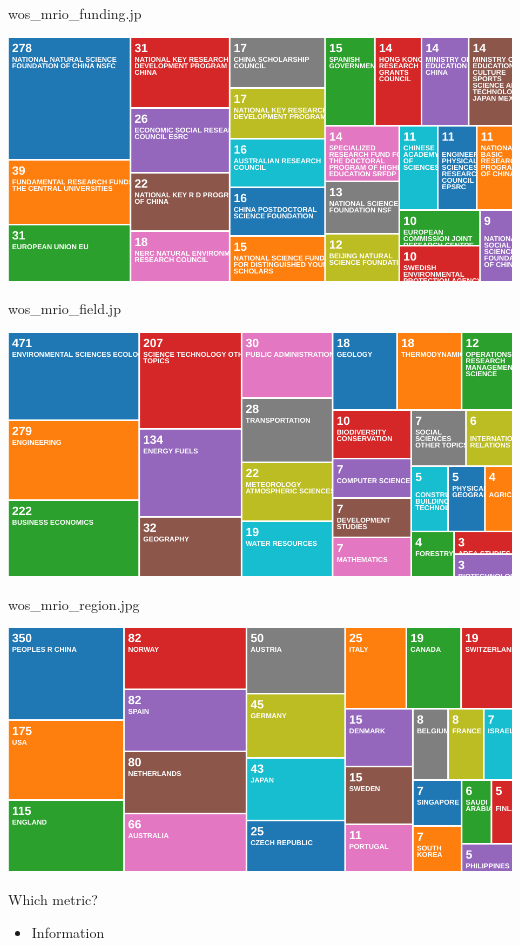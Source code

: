 \documentclass{beamer}
\begin{document}
\begin{frame}{wos\_mrio\_funding.jp}

\begin{center}\includegraphics[width=0.5\linewidth]{images/wos_mrio_funding} \end{center}

\end{frame}

\begin{frame}{wos\_mrio\_field.jp}

\begin{center}\includegraphics[width=0.5\linewidth]{images/wos_mrio_field} \end{center}

\end{frame}

\begin{frame}{wos\_mrio\_region.jpg}

\begin{center}\includegraphics[width=0.5\linewidth]{images/wos_mrio_region} \end{center}

\end{frame}

\begin{frame}{Which metric?}

\begin{itemize}
\item
  Information
\end{itemize}

\end{frame}
\end{document}
